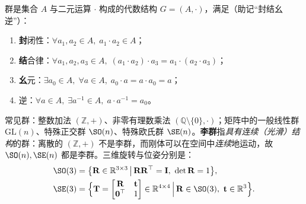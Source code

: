 \begin{definition}[群]\label{def:group}
群是集合 $A$ 与二元运算 $\cdot$ 构成的代数结构 $G=(A,\cdot)$，满足（助记“封结幺逆”）：
\begin{enumerate}
  \item \textbf{封}闭性：$\forall a_1,a_2\in A,\; a_1\cdot a_2\in A$；
  \item \textbf{结}合律：$\forall a_1,a_2,a_3\in A,\;(a_1\cdot a_2)\cdot a_3=a_1\cdot(a_2\cdot a_3)$；
  \item \textbf{幺}元：$\exists a_0\in A,\;\forall a\in A,\; a_0\cdot a=a\cdot a_0=a$；
  \item 逆：$\forall a\in A,\;\exists a^{-1}\in A,\; a\cdot a^{-1}=a_0$。
\end{enumerate}
\end{definition}

\noindent 常见群：整数加法 $(\mathbb{Z},+)$、非零有理数乘法 $(\mathbb{Q}\setminus\{0\},\cdot)$；矩阵中的一般线性群 $\mathrm{GL}(n)$、特殊正交群 $\SO(n)$、特殊欧氏群 $\SE(n)$。\textbf{李群}指\emph{具有连续（光滑）结构}的群：离散的 $(\mathbb{Z},+)$ 不是李群，而刚体可以在空间中\emph{连续}地运动，故 $\SO(n),\SE(n)$ 都是李群。三维旋转与位姿分别是：
\begin{align}
  \SO(3) &= \big\{\mathbf{R}\in\mathbb{R}^{3\times3}\,\big|\,\mathbf{R}\mathbf{R}^\top=\mathbf{I},\ \det\mathbf{R}=1\big\},\label{eq:so3}\\
  \SE(3) &= \Big\{\mathbf{T}=\begin{bmatrix}\mathbf{R}&\mathbf{t}\\\mathbf{0}^\top&1\end{bmatrix}\in\mathbb{R}^{4\times4}\,\Big|\,\mathbf{R}\in\SO(3),\ \mathbf{t}\in\mathbb{R}^3\Big\}.\label{eq:se3}
\end{align}

